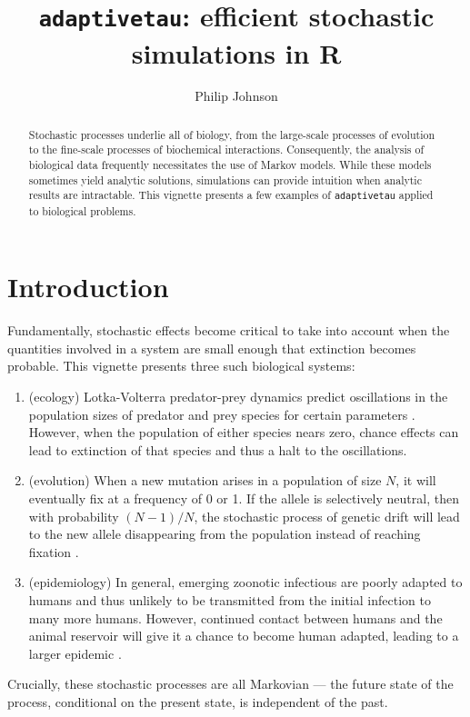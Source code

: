 \documentclass[11pt,nogin]{article}
\begin{document}
\title{\texttt{adaptivetau}: efficient stochastic simulations in R}
\author{Philip Johnson}
\date{}
\maketitle
\begin{abstract}
  Stochastic processes underlie all of biology, from the large-scale processes of evolution to the fine-scale processes of biochemical interactions. Consequently, the analysis of biological data frequently necessitates the use of Markov models.  While these models sometimes yield analytic solutions, simulations can provide intuition when analytic results are intractable.  This vignette presents a few examples of \texttt{adaptivetau} applied to biological problems.
\end{abstract}


\section*{Introduction}

Fundamentally, stochastic effects become critical to take into account when the quantities involved in a system are small enough that extinction becomes probable.  This vignette presents three such biological systems:
\begin{enumerate}
  \item (ecology) Lotka-Volterra predator-prey dynamics predict oscillations in the population sizes of predator and prey species for certain parameters \citep{Lot20}.  However, when the population of either species nears zero, chance effects can lead to extinction of that species and thus a halt to the oscillations.
  \item (evolution) When a new mutation arises in a population of size $N$, it will eventually fix at a frequency of 0 or 1.   If the allele is selectively neutral, then with probability $(N-1)/N$, the stochastic process of genetic drift will lead to the new allele disappearing from the population instead of reaching fixation \citep{Kim57}.
  \item (epidemiology) In general, emerging zoonotic infectious are poorly adapted to humans and thus unlikely to be transmitted from the initial infection to many more humans.  However, continued contact between humans and the animal reservoir will give it a chance to become human adapted, leading to a larger epidemic \citep{LGP+09}.
\end{enumerate}
Crucially, these stochastic processes are all Markovian --- the future state of the process, conditional on the present state, is independent of the past.
\end{document}
